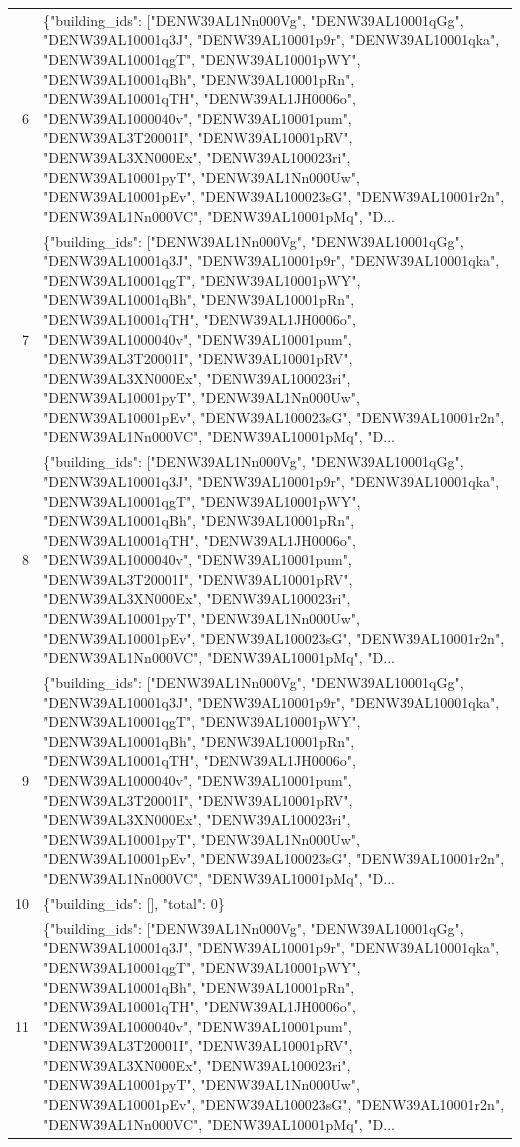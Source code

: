 \documentclass[a4paper,11pt]{article}
\begin{document}
\begin{table}[ht]
\begin{tabular}{r p{12cm}}
6 & \{"building\_ids": ["DENW39AL1Nn000Vg", "DENW39AL10001qGg", "DENW39AL10001q3J", "DENW39AL10001p9r", "DENW39AL10001qka", "DENW39AL10001qgT", "DENW39AL10001pWY", "DENW39AL10001qBh", "DENW39AL10001pRn", "DENW39AL10001qTH", "DENW39AL1JH0006o", "DENW39AL1000040v", "DENW39AL10001pum", "DENW39AL3T20001I", "DENW39AL10001pRV", "DENW39AL3XN000Ex", "DENW39AL100023ri", "DENW39AL10001pyT", "DENW39AL1Nn000Uw", "DENW39AL10001pEv", "DENW39AL100023sG", "DENW39AL10001r2n", "DENW39AL1Nn000VC", "DENW39AL10001pMq", "D... \\
7 & \{"building\_ids": ["DENW39AL1Nn000Vg", "DENW39AL10001qGg", "DENW39AL10001q3J", "DENW39AL10001p9r", "DENW39AL10001qka", "DENW39AL10001qgT", "DENW39AL10001pWY", "DENW39AL10001qBh", "DENW39AL10001pRn", "DENW39AL10001qTH", "DENW39AL1JH0006o", "DENW39AL1000040v", "DENW39AL10001pum", "DENW39AL3T20001I", "DENW39AL10001pRV", "DENW39AL3XN000Ex", "DENW39AL100023ri", "DENW39AL10001pyT", "DENW39AL1Nn000Uw", "DENW39AL10001pEv", "DENW39AL100023sG", "DENW39AL10001r2n", "DENW39AL1Nn000VC", "DENW39AL10001pMq", "D... \\
8 & \{"building\_ids": ["DENW39AL1Nn000Vg", "DENW39AL10001qGg", "DENW39AL10001q3J", "DENW39AL10001p9r", "DENW39AL10001qka", "DENW39AL10001qgT", "DENW39AL10001pWY", "DENW39AL10001qBh", "DENW39AL10001pRn", "DENW39AL10001qTH", "DENW39AL1JH0006o", "DENW39AL1000040v", "DENW39AL10001pum", "DENW39AL3T20001I", "DENW39AL10001pRV", "DENW39AL3XN000Ex", "DENW39AL100023ri", "DENW39AL10001pyT", "DENW39AL1Nn000Uw", "DENW39AL10001pEv", "DENW39AL100023sG", "DENW39AL10001r2n", "DENW39AL1Nn000VC", "DENW39AL10001pMq", "D... \\
9 & \{"building\_ids": ["DENW39AL1Nn000Vg", "DENW39AL10001qGg", "DENW39AL10001q3J", "DENW39AL10001p9r", "DENW39AL10001qka", "DENW39AL10001qgT", "DENW39AL10001pWY", "DENW39AL10001qBh", "DENW39AL10001pRn", "DENW39AL10001qTH", "DENW39AL1JH0006o", "DENW39AL1000040v", "DENW39AL10001pum", "DENW39AL3T20001I", "DENW39AL10001pRV", "DENW39AL3XN000Ex", "DENW39AL100023ri", "DENW39AL10001pyT", "DENW39AL1Nn000Uw", "DENW39AL10001pEv", "DENW39AL100023sG", "DENW39AL10001r2n", "DENW39AL1Nn000VC", "DENW39AL10001pMq", "D... \\
10 & \{"building\_ids": [], "total": 0\} \\
11 & \{"building\_ids": ["DENW39AL1Nn000Vg", "DENW39AL10001qGg", "DENW39AL10001q3J", "DENW39AL10001p9r", "DENW39AL10001qka", "DENW39AL10001qgT", "DENW39AL10001pWY", "DENW39AL10001qBh", "DENW39AL10001pRn", "DENW39AL10001qTH", "DENW39AL1JH0006o", "DENW39AL1000040v", "DENW39AL10001pum", "DENW39AL3T20001I", "DENW39AL10001pRV", "DENW39AL3XN000Ex", "DENW39AL100023ri", "DENW39AL10001pyT", "DENW39AL1Nn000Uw", "DENW39AL10001pEv", "DENW39AL100023sG", "DENW39AL10001r2n", "DENW39AL1Nn000VC", "DENW39AL10001pMq", "D... \\

\end{tabular}
\end{table}
\end{document}
